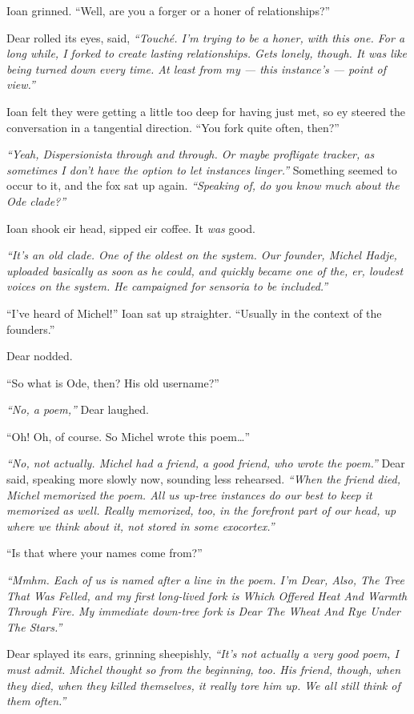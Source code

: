 Ioan grinned. ``Well, are you a forger or a honer of relationships?''

Dear rolled its eyes, said, \emph{``Touché. I'm trying to be a honer, with this one. For a long while, I forked to create lasting relationships. Gets lonely, though. It was like being turned down every time. At least from my --- this instance's --- point of view.''}

Ioan felt they were getting a little too deep for having just met, so ey steered the conversation in a tangential direction. ``You fork quite often, then?''

\emph{``Yeah, Dispersionista through and through. Or maybe profligate tracker, as sometimes I don't have the option to let instances linger.''} Something seemed to occur to it, and the fox sat up again. \emph{``Speaking of, do you know much about the Ode clade?''}

Ioan shook eir head, sipped eir coffee. It \emph{was} good.

\emph{``It's an old clade. One of the oldest on the system. Our founder, Michel Hadje, uploaded basically as soon as he could, and quickly became one of the, er, loudest voices on the system. He campaigned for sensoria to be included.''}

``I've heard of Michel!'' Ioan sat up straighter. ``Usually in the context of the founders.''

Dear nodded.

``So what is Ode, then? His old username?''

\emph{``No, a poem,''} Dear laughed.

``Oh! Oh, of course. So Michel wrote this poem\ldots{}''

\emph{``No, not actually. Michel had a friend, a good friend, who wrote the poem.''} Dear said, speaking more slowly now, sounding less rehearsed. \emph{``When the friend died, Michel memorized the poem. All us up-tree instances do our best to keep it memorized as well. Really memorized, too, in the forefront part of our head, up where we think about it, not stored in some exocortex.''}

``Is that where your names come from?''

\emph{``Mmhm. Each of us is named after a line in the poem. I'm Dear, Also, The Tree That Was Felled, and my first long-lived fork is Which Offered Heat And Warmth Through Fire. My immediate down-tree fork is Dear The Wheat And Rye Under The Stars.''}

Dear splayed its ears, grinning sheepishly, \emph{``It's not actually a very good poem, I must admit. Michel thought so from the beginning, too. His friend, though, when they died, when they killed themselves, it really tore him up. We all still think of them often.''}

